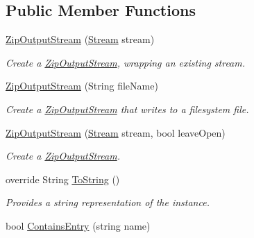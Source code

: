 \subsection*{Public Member Functions}
\begin{DoxyCompactItemize}
\item 
\mbox{\hyperlink{class_super_tiled2_unity_1_1_ionic_1_1_zip_1_1_zip_output_stream_ae484108e008d5822cd7e140bcf44e9fe}{Zip\+Output\+Stream}} (\mbox{\hyperlink{namespace_super_tiled2_unity_1_1_ionic_1_1_zip_a9ced5352c56e7e0fceff15b534073c83aeae835e83c0494a376229f254f7d3392}{Stream}} stream)
\begin{DoxyCompactList}\small\item\em Create a \mbox{\hyperlink{class_super_tiled2_unity_1_1_ionic_1_1_zip_1_1_zip_output_stream}{Zip\+Output\+Stream}}, wrapping an existing stream. \end{DoxyCompactList}\item 
\mbox{\hyperlink{class_super_tiled2_unity_1_1_ionic_1_1_zip_1_1_zip_output_stream_a4daf8120abcc71a6b939770b50a82ccf}{Zip\+Output\+Stream}} (String file\+Name)
\begin{DoxyCompactList}\small\item\em Create a \mbox{\hyperlink{class_super_tiled2_unity_1_1_ionic_1_1_zip_1_1_zip_output_stream}{Zip\+Output\+Stream}} that writes to a filesystem file. \end{DoxyCompactList}\item 
\mbox{\hyperlink{class_super_tiled2_unity_1_1_ionic_1_1_zip_1_1_zip_output_stream_a4eb05835f11ff46020c97b18a25efd27}{Zip\+Output\+Stream}} (\mbox{\hyperlink{namespace_super_tiled2_unity_1_1_ionic_1_1_zip_a9ced5352c56e7e0fceff15b534073c83aeae835e83c0494a376229f254f7d3392}{Stream}} stream, bool leave\+Open)
\begin{DoxyCompactList}\small\item\em Create a \mbox{\hyperlink{class_super_tiled2_unity_1_1_ionic_1_1_zip_1_1_zip_output_stream}{Zip\+Output\+Stream}}. \end{DoxyCompactList}\item 
override String \mbox{\hyperlink{class_super_tiled2_unity_1_1_ionic_1_1_zip_1_1_zip_output_stream_afaa579ec2191f58bf906b13b6880bf9c}{To\+String}} ()
\begin{DoxyCompactList}\small\item\em Provides a string representation of the instance.\end{DoxyCompactList}\item 
bool \mbox{\hyperlink{class_super_tiled2_unity_1_1_ionic_1_1_zip_1_1_zip_output_stream_a0940da1079aec5a86af767da50b1ba0d}{Contains\+Entry}} (string name)

\end{DoxyCompactItemize}

